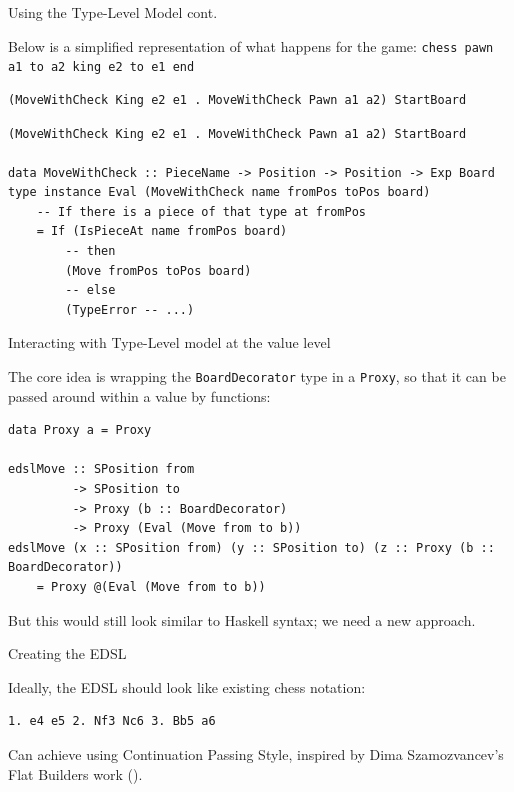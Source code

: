 \documentclass{beamer}
\newcommand{\inline}[1]{\lstinline[basicstyle=\ttfamily]{#1}}
\begin{document}
\begin{frame}[fragile]{Using the Type-Level Model cont.}

Below is a simplified representation of what happens for the game: \inline{chess pawn a1 to a2 king e2 to e1 end}

\begin{overprint}

\begin{lstlisting}
(MoveWithCheck King e2 e1 . MoveWithCheck Pawn a1 a2) StartBoard
\end{lstlisting}

\begin{lstlisting}
(MoveWithCheck King e2 e1 . MoveWithCheck Pawn a1 a2) StartBoard

data MoveWithCheck :: PieceName -> Position -> Position -> Exp Board
type instance Eval (MoveWithCheck name fromPos toPos board)
    -- If there is a piece of that type at fromPos
    = If (IsPieceAt name fromPos board)
        -- then
        (Move fromPos toPos board)
        -- else
        (TypeError -- ...)
\end{lstlisting}

\end{overprint}

\end{frame}

\begin{frame}[fragile]{Interacting with Type-Level model at the value level}

The core idea is wrapping the \inline{BoardDecorator} type in a \inline{Proxy}, so that it can be passed around within a value by functions:

\begin{lstlisting}
data Proxy a = Proxy

edslMove :: SPosition from
         -> SPosition to
         -> Proxy (b :: BoardDecorator)
         -> Proxy (Eval (Move from to b))
edslMove (x :: SPosition from) (y :: SPosition to) (z :: Proxy (b :: BoardDecorator))
    = Proxy @(Eval (Move from to b))
\end{lstlisting}

But this would still look similar to Haskell syntax; we need a new approach.

\end{frame}

\begin{frame}[fragile]{Creating the EDSL}

Ideally, the EDSL should look like existing chess notation:

\begin{verbatim}
1. e4 e5 2. Nf3 Nc6 3. Bb5 a6
\end{verbatim}


Can achieve using Continuation Passing Style, inspired by Dima Szamozvancev's Flat Builders work (\cite{mezzo}).

\end{frame}
\end{document}
